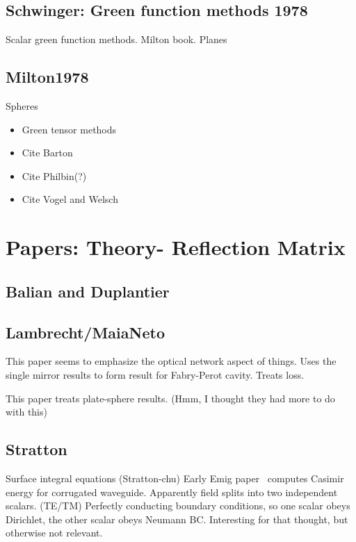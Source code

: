 \subsection{Schwinger: Green function methods 1978}

\cite{Schwinger1978, Milton1978}

Scalar green function methods.  Milton book.  
Planes

\subsection{Milton1978}
Spheres

\begin{itemize}
\item Green tensor methods
\item Cite Barton
\item Cite Philbin(?)
\item Cite Vogel and Welsch
\end{itemize}

\section{Papers: Theory- Reflection Matrix}

\subsection{Balian and Duplantier}
\cite{Balian1977} \cite{Balian1978}
\subsection{Lambrecht/MaiaNeto}

\cite{Lambrecht2006}
This paper seems to emphasize the optical network aspect of things.  
Uses the single mirror results to form result for Fabry-Perot cavity.
Treats loss.  

\cite{MaiaNeto2008}
This paper treats plate-sphere results.  (Hmm, I thought they had more to do with this)

\cite{Canaguier-Durand2012}

\subsection{Stratton}
Surface integral equations (Stratton-chu)
\cite{Stratton1941}
Early Emig paper~\cite{Emig2001} computes Casimir energy for corrugated waveguide.
Apparently field splits into two independent scalars.  (TE/TM)
Perfectly conducting boundary conditions, so one scalar obeys Dirichlet, 
the other scalar obeys Neumann BC.
  Interesting for that thought, but otherwise not relevant.  

